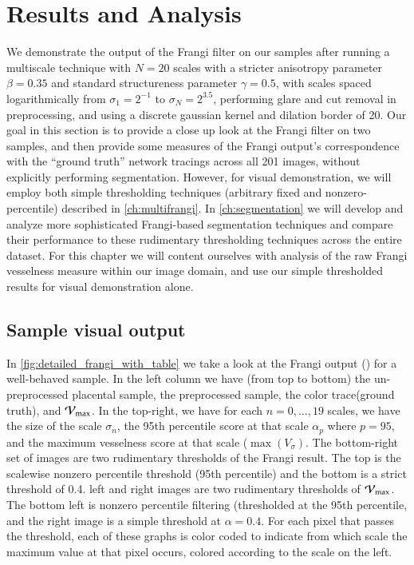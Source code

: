 \chapter{Results and Analysis} \label{ch:results-analysis}

We demonstrate the output of the Frangi filter on our samples after running a multiscale technique with $N=20$ scales with a stricter anisotropy parameter $\beta = 0.35$ and standard structureness parameter $\gamma=0.5$,
with scales spaced logarithmically from $\sigma_1 = 2^{-1}$ to $\sigma_N = 2^{3.5}$, performing glare and cut removal in preprocessing, and using a discrete gaussian kernel and dilation border of 20.
Our goal in this section is to provide a close up look at the Frangi filter on two samples, and then provide some measures of the Frangi output's correspondence with the ``ground truth'' network tracings across all 201 images, without explicitly performing segmentation. However, for visual demonstration, we will employ both simple thresholding techniques (arbitrary fixed and nonzero-percentile) described in \cref{ch:multifrangi}. In \cref{ch:segmentation} we will develop and analyze more sophisticated Frangi-based segmentation techniques and compare their performance to these rudimentary thresholding techniques across the entire dataset. For this chapter we will content ourselves with analysis of the raw Frangi vesselness measure within our image domain, and use our simple thresholded results for visual demonstration alone.

\section{Sample visual output}
In \cref{fig:detailed_frangi_with_table} we take a look at the Frangi output (\Vmax) for a well-behaved sample. In the left column we have (from top to bottom) the un-preprocessed placental sample, the preprocessed sample, the color trace(ground truth), and $\mathcal{V}_{\max}$. In the top-right, we have for each $n=0,...,19$ scales, we have the size of the scale $\sigma_n$, the 95th percentile score at that scale  $\alpha_p$ where $p=95$, and the maximum vesselness score at that scale ($\max(V_\sigma)$. The bottom-right set of images are two rudimentary thresholds of the Frangi result. The top is the scalewise nonzero percentile threshold (95th percentile) and the bottom is a strict threshold of 0.4. left and right images are two rudimentary thresholds of $\mathcal{V}_{\max}$. The bottom left is nonzero percentile filtering (thresholded at the 95th percentile, and the  right image is a simple threshold at $\alpha=0.4$. For each pixel that passes the threshold, each of these graphs is color coded to indicate from which scale the maximum value at that pixel occurs, colored according to the scale on the left.

